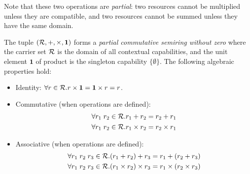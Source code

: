 Note that these two operations are \emph{partial}: two resources
cannot be multiplied unless they are compatible, and two resources
cannot be summed unless they have the same domain.

\begin{definition}\label{def:contextual-capabilities-algebra}
  The tuple $(\mathcal{R},{+},{\times},\mathbf{1})$ forms a \emph{partial
    commutative semiring without zero} where the carrier set $\mathcal{R}$ is
  the domain of all contextual capabilities, and the unit
  element $\mathbf{1}$ of product is the singleton capability
  $\{\emptyset\}$.
  The following algebraic properties hold:
  \begin{itemize}
  \item Identity: $\forall r \in \mathcal{R}. r \times \mathbf{1} = \mathbf{1} \times r = r$.
  \item Commutative (when operations are defined):
  \begin{align*}
    \forall r_1\;r_2 \in \mathcal{R}. r_1 + r_2 = r_2 + r_1 \\
    \forall r_1\;r_2 \in \mathcal{R}. r_1 \times r_2 = r_2 \times r_1
  \end{align*}
  \item Associative (when operations are defined):
  \begin{align*}
    \forall r_1\;r_2\;r_3 \in \mathcal{R}. (r_1 + r_2) + r_3 = r_1 + (r_2 + r_3) \\
    \forall r_1\;r_2\;r_3 \in \mathcal{R}. (r_1 \times r_2) \times r_3 = r_1 \times (r_2 \times r_3)
  \end{align*}
  \end{itemize}
\end{definition}


